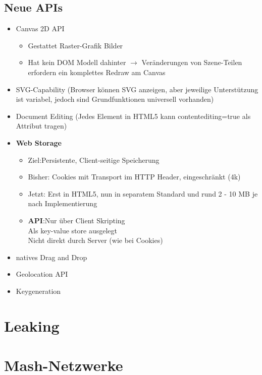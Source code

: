 \documentclass{article} %
\begin{document}
		\subsection{Neue APIs}
		\begin{itemize}
			\item Canvas 2D API
			\begin{itemize}
				\item Gestattet Raster-Grafik Bilder
				\item Hat kein DOM Modell dahinter $\rightarrow$ Veränderungen von Szene-Teilen erfordern ein komplettes Redraw am Canvas
			\end{itemize}
			\item SVG-Capability (Browser können SVG anzeigen, aber jeweilige Unterstützung ist variabel, jedoch sind Grundfunktionen universell vorhanden)
			\item Document Editing (Jedes Element in HTML5 kann contentediting=true als Attribut tragen)
			\item \textbf{Web Storage}
			\begin{itemize}
				\item Ziel:Persistente, Client-seitige Speicherung
				\item Bisher: Cookies mit Transport im HTTP Header, eingeschränkt (4k)
				\item Jetzt: Erst in HTML5, nun in separatem Standard und rund 2 - 10 MB je nach Implementierung
				\item \textbf{API}:Nur über Client Skripting\\
				Als key-value store ausgelegt\\
				Nicht direkt durch Server (wie bei Cookies)
			\end{itemize}
			\item natives Drag and Drop
			\item Geolocation API
			\item Keygeneration
		\end{itemize}
\section{Leaking}
\section{Mash-Netzwerke}
\end{document}
